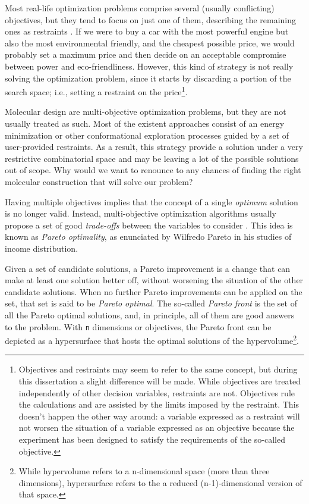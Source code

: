 Most real-life optimization problems comprise several (usually conflicting) objectives, but they tend to focus on just one of them, describing the remaining ones as restraints . If we were to buy a car with the most powerful engine but also the most environmental friendly, and the cheapest possible price, we would probably set a maximum price and then decide on an acceptable compromise between power and eco-friendliness. However, this kind of strategy is not really solving the optimization problem, since it starts by discarding a portion of the search space; i.e., setting a restraint on the price\footnote{Objectives and restraints may seem to refer to the same concept, but during this dissertation a slight difference will be made. While objectives are treated independently of other decision variables, restraints are not. Objectives rule the calculations and are assisted by the limits imposed by the restraint. This doesn't happen the other way around: a variable expressed as a restraint will not worsen the situation of a variable expressed as an objective because the experiment has been designed to satisfy the requirements of the so-called objective.}.

Molecular design are multi-objective optimization problems, but they are not usually treated as such. Most of the existent approaches consist of an energy minimization or other conformational exploration processes guided by a set of user-provided restraints. As a result, this strategy provide a solution under a very restrictive combinatorial space and may be leaving a lot of the possible solutions out of scope. Why would we want to renounce to any chances of finding the right molecular construction that will solve our problem?

Having multiple objectives implies that the concept of a single \emph{optimum} solution is no longer valid. Instead, multi-objective optimization algorithms usually propose a set of good \emph{trade-offs} between the  variables to consider . This idea is known as \emph{Pareto optimality}, as enunciated by Wilfredo Pareto in his studies of income distribution.

Given a set of candidate solutions, a Pareto improvement is a change that can make at least one solution better off, without worsening the situation of the other candidate solutions. When no further Pareto improvements can be applied on the set, that set is said to be \emph{Pareto optimal}. The so-called \emph{Pareto front} is the set of all the Pareto optimal solutions, and, in principle, all of them are good answers to the problem. With \texttt{n} dimensions or objectives, the Pareto front can be depicted as a hypersurface that hosts the optimal solutions of the hypervolume\footnote{While hypervolume refers to a n-dimensional space (more than three dimensions), hypersurface refers to the a reduced (n-1)-dimensional version of that space.}.

